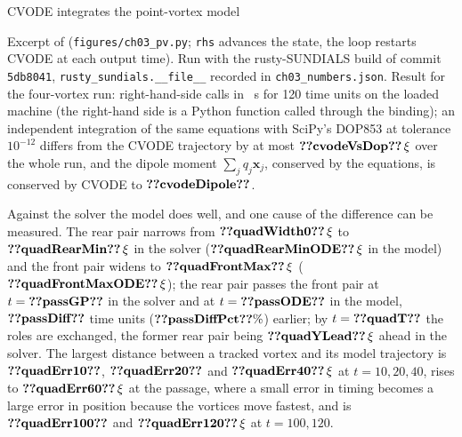 \begin{rustbox}{CVODE integrates the point-vortex model}

\medskip

\smallskip\footnotesize
Excerpt of  (\texttt{figures/ch03\_pv.py}; \texttt{rhs} advances the state, the loop restarts CVODE at each output time). Run with the rusty-SUNDIALS build of commit \texttt{5db8041}, \texttt{rusty\_sundials.\_\_file\_\_} recorded in \texttt{ch03\_numbers.json}. Result for the four-vortex run:  right-hand-side calls in ~s for 120 time units on the loaded machine (the right-hand side is a Python function called through the binding); an independent integration of the same equations with SciPy's DOP853 at tolerance $10^{-12}$ differs from the CVODE trajectory by at most $\cthreeNum{cvodeVsDop}\,\xi$ over the whole run, and the dipole moment $\sum_jq_j\mathbf x_j$, conserved by the equations, is conserved by CVODE to $\cthreeNum{cvodeDipole}$.
\end{rustbox}

Against the solver the model does well, and one cause of the difference can be measured. The rear pair narrows from $\cthreeNum{quadWidth0}\,\xi$ to $\cthreeNum{quadRearMin}\,\xi$ in the solver ($\cthreeNum{quadRearMinODE}\,\xi$ in the model) and the front pair widens to $\cthreeNum{quadFrontMax}\,\xi$ ($\cthreeNum{quadFrontMaxODE}\,\xi$); the rear pair passes the front pair at $t=\cthreeNum{passGP}$ in the solver and at $t=\cthreeNum{passODE}$ in the model, $\cthreeNum{passDiff}$ time units ($\cthreeNum{passDiffPct}\%$) earlier; by $t=\cthreeNum{quadT}$ the roles are exchanged, the former rear pair being $\cthreeNum{quadYLead}\,\xi$ ahead in the solver. The largest distance between a tracked vortex and its model trajectory is $\cthreeNum{quadErr10}$, $\cthreeNum{quadErr20}$ and $\cthreeNum{quadErr40}\,\xi$ at $t=10,20,40$, rises to $\cthreeNum{quadErr60}\,\xi$ at the passage, where a small error in timing becomes a large error in position because the vortices move fastest, and is $\cthreeNum{quadErr100}$ and $\cthreeNum{quadErr120}\,\xi$ at $t=100,120$.

